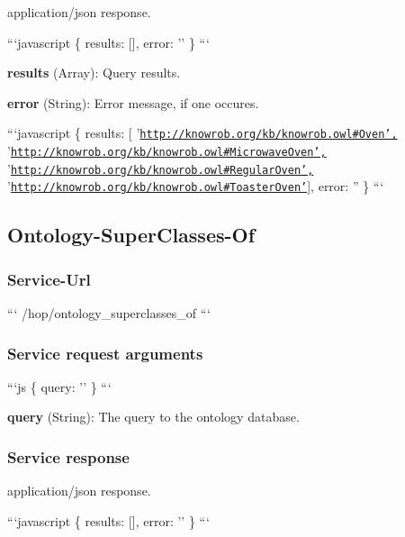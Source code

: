 application/json response.

```javascript \{ results\-: \mbox{[}\mbox{]}, error\-: '' \} ```


\begin{DoxyItemize}
\item {\bfseries results} (Array)\-: Query results.
\item {\bfseries error} (String)\-: Error message, if one occures.
\end{DoxyItemize}

```javascript \{ results\-: \mbox{[} '\href{http://knowrob.org/kb/knowrob.owl#Oven',}{\tt http\-://knowrob.\-org/kb/knowrob.\-owl\#\-Oven',} '\href{http://knowrob.org/kb/knowrob.owl#MicrowaveOven',}{\tt http\-://knowrob.\-org/kb/knowrob.\-owl\#\-Microwave\-Oven',} '\href{http://knowrob.org/kb/knowrob.owl#RegularOven',}{\tt http\-://knowrob.\-org/kb/knowrob.\-owl\#\-Regular\-Oven',} '\href{http://knowrob.org/kb/knowrob.owl#ToasterOven'}{\tt http\-://knowrob.\-org/kb/knowrob.\-owl\#\-Toaster\-Oven'}\mbox{]}, error\-: '' \} ```

\subsection*{Ontology-\/\-Super\-Classes-\/\-Of}

\subsubsection*{Service-\/\-Url}

``` /hop/ontology\-\_\-superclasses\-\_\-of ```

\subsubsection*{Service request arguments}

```js \{ query\-: '' \} ```


\begin{DoxyItemize}
\item {\bfseries query} (String)\-: The query to the ontology database.
\end{DoxyItemize}

\subsubsection*{Service response}

application/json response.

```javascript \{ results\-: \mbox{[}\mbox{]}, error\-: '' \} ```


